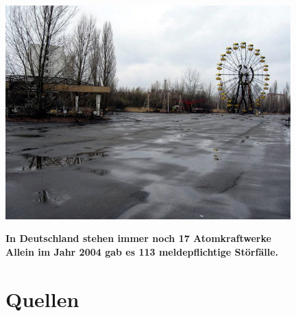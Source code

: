 \documentclass{beamer}
\begin{document}
\begin{frame}[plain]{}
    \begin{center}
        \includegraphics[width=11cm]{img/Heute_4.jpg}\\
    \end{center}
\end{frame}

\begin{frame}
    \begin{block}{}
        \begin{center}
            \textbf{In Deutschland stehen immer noch 17 Atomkraftwerke\\[1em]
            Allein im Jahr 2004 gab es 113 meldepflichtige Störfälle.}
        \end{center}
    \end{block}
\end{frame}

\section*{Quellen}
\end{document}
